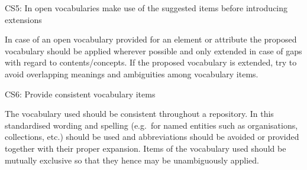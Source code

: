 CS5: In open vocabularies make use of the suggested items before introducing extensions

 

In case of an open vocabulary provided for an element or attribute the proposed vocabulary should be applied wherever possible and only extended in case of gaps with regard to contents/concepts. If the proposed vocabulary is extended, try to avoid overlapping meanings and ambiguities among vocabulary items.


CS6: Provide consistent vocabulary items


The vocabulary used should be consistent throughout a repository. In this standardised wording and spelling (e.g.~for named entities such as organisations, collections, etc.) should be used and abbreviations should be avoided or provided together with their proper expansion. Items of the vocabulary used should be mutually exclusive so that they hence may be unambiguously applied.
